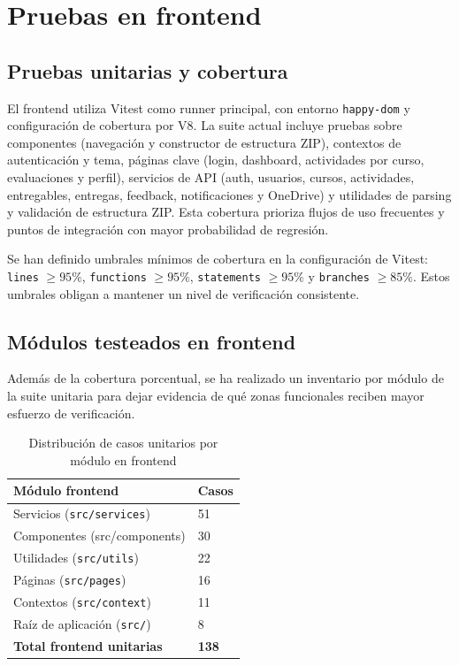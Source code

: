 \section{Pruebas en frontend}

\subsection{Pruebas unitarias y cobertura}

El frontend utiliza Vitest como runner principal,
con entorno \texttt{happy-dom} y configuraci\'on de cobertura por V8.
La suite actual incluye pruebas sobre componentes (navegaci\'on y constructor de estructura ZIP), contextos de autenticaci\'on y tema, p\'aginas clave (login, dashboard, actividades por curso, evaluaciones y perfil), servicios de API (auth, usuarios, cursos, actividades, entregables, entregas, feedback, notificaciones y OneDrive) y utilidades de parsing y validaci\'on de estructura ZIP. Esta cobertura prioriza flujos de uso frecuentes y puntos de integraci\'on con mayor probabilidad de regresi\'on.

Se han definido umbrales m\'inimos de cobertura en la configuraci\'on de Vitest: \texttt{lines} \(\ge 95\%\), \texttt{functions} \(\ge 95\%\), \texttt{statements} \(\ge 95\%\) y \texttt{branches} \(\ge 85\%\). Estos umbrales obligan a mantener un nivel de verificaci\'on consistente.

\subsection{M\'odulos testeados en frontend}

Adem\'as de la cobertura porcentual, se ha realizado un inventario por m\'odulo
de la suite unitaria para dejar evidencia de qu\'e zonas funcionales reciben
mayor esfuerzo de verificaci\'on.

\begin{table}[!htbp]
\centering
\begin{tabular}{|P{5.6cm}|P{2.2cm}|}
\hline
\textbf{M\'odulo frontend} & \textbf{Casos} \\
\hline
Servicios (\texttt{src/services}) & 51 \\
\hline
Componentes (src/components) & 30 \\
\hline
Utilidades (\texttt{src/utils}) & 22 \\
\hline
P\'aginas (\texttt{src/pages}) & 16 \\
\hline
Contextos (\texttt{src/context}) & 11 \\
\hline
Ra\'iz de aplicaci\'on (\texttt{src/}) & 8 \\
\hline
\textbf{Total frontend unitarias} & \textbf{138} \\
\hline
\end{tabular}
\caption{Distribuci\'on de casos unitarios por m\'odulo en frontend}
\label{tab:frontend-modulos-testeados}
\end{table}

